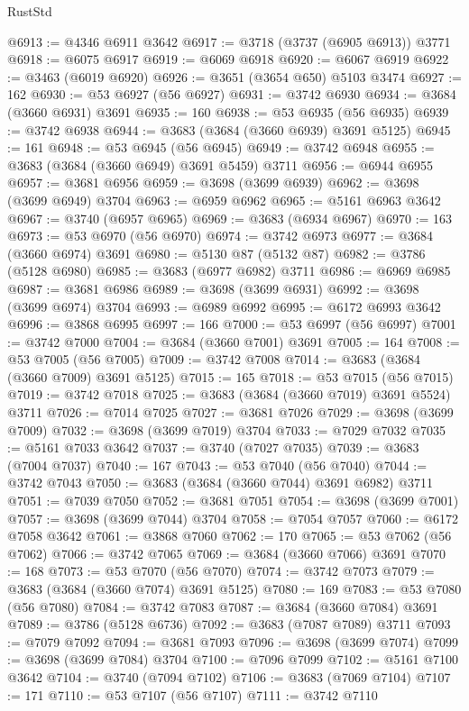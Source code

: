 \begin{lexlean}{RustStd}
\begin{coremodule}
{\begin{coremodule}
{{{{{{{{{{{{{{{{{{{{{{{{{{{{{{{{{{{{{{{{{{{{{{{@6913 := @4346 @6911 @3642
@6917 := @3718 (@3737 (@6905 @6913)) @3771
@6918 := @6075 @6917
@6919 := @6069 @6918
@6920 := @6067 @6919
@6922 := @3463 (@6019 @6920)
@6926 := @3651 (@3654 @650) @5103 @3474
@6927 := 162
@6930 := @53 @6927 (@56 @6927)
@6931 := @3742 @6930
@6934 := @3684 (@3660 @6931) @3691
@6935 := 160
@6938 := @53 @6935 (@56 @6935)
@6939 := @3742 @6938
@6944 := @3683 (@3684 (@3660 @6939) @3691 @5125)
@6945 := 161
@6948 := @53 @6945 (@56 @6945)
@6949 := @3742 @6948
@6955 := @3683 (@3684 (@3660 @6949) @3691 @5459) @3711
@6956 := @6944 @6955
@6957 := @3681 @6956
@6959 := @3698 (@3699 @6939)
@6962 := @3698 (@3699 @6949) @3704
@6963 := @6959 @6962
@6965 := @5161 @6963 @3642
@6967 := @3740 (@6957 @6965)
@6969 := @3683 (@6934 @6967)
@6970 := 163
@6973 := @53 @6970 (@56 @6970)
@6974 := @3742 @6973
@6977 := @3684 (@3660 @6974) @3691
@6980 := @5130 @87 (@5132 @87)
@6982 := @3786 (@5128 @6980)
@6985 := @3683 (@6977 @6982) @3711
@6986 := @6969 @6985
@6987 := @3681 @6986
@6989 := @3698 (@3699 @6931)
@6992 := @3698 (@3699 @6974) @3704
@6993 := @6989 @6992
@6995 := @6172 @6993 @3642
@6996 := @3868 @6995
@6997 := 166
@7000 := @53 @6997 (@56 @6997)
@7001 := @3742 @7000
@7004 := @3684 (@3660 @7001) @3691
@7005 := 164
@7008 := @53 @7005 (@56 @7005)
@7009 := @3742 @7008
@7014 := @3683 (@3684 (@3660 @7009) @3691 @5125)
@7015 := 165
@7018 := @53 @7015 (@56 @7015)
@7019 := @3742 @7018
@7025 := @3683 (@3684 (@3660 @7019) @3691 @5524) @3711
@7026 := @7014 @7025
@7027 := @3681 @7026
@7029 := @3698 (@3699 @7009)
@7032 := @3698 (@3699 @7019) @3704
@7033 := @7029 @7032
@7035 := @5161 @7033 @3642
@7037 := @3740 (@7027 @7035)
@7039 := @3683 (@7004 @7037)
@7040 := 167
@7043 := @53 @7040 (@56 @7040)
@7044 := @3742 @7043
@7050 := @3683 (@3684 (@3660 @7044) @3691 @6982) @3711
@7051 := @7039 @7050
@7052 := @3681 @7051
@7054 := @3698 (@3699 @7001)
@7057 := @3698 (@3699 @7044) @3704
@7058 := @7054 @7057
@7060 := @6172 @7058 @3642
@7061 := @3868 @7060
@7062 := 170
@7065 := @53 @7062 (@56 @7062)
@7066 := @3742 @7065
@7069 := @3684 (@3660 @7066) @3691
@7070 := 168
@7073 := @53 @7070 (@56 @7070)
@7074 := @3742 @7073
@7079 := @3683 (@3684 (@3660 @7074) @3691 @5125)
@7080 := 169
@7083 := @53 @7080 (@56 @7080)
@7084 := @3742 @7083
@7087 := @3684 (@3660 @7084) @3691
@7089 := @3786 (@5128 @6736)
@7092 := @3683 (@7087 @7089) @3711
@7093 := @7079 @7092
@7094 := @3681 @7093
@7096 := @3698 (@3699 @7074)
@7099 := @3698 (@3699 @7084) @3704
@7100 := @7096 @7099
@7102 := @5161 @7100 @3642
@7104 := @3740 (@7094 @7102)
@7106 := @3683 (@7069 @7104)
@7107 := 171
@7110 := @53 @7107 (@56 @7107)
@7111 := @3742 @7110
}}}}}}}}}}}}}}}}}}}}}}}}}}}}}}}}}}}}}}}}}}}}}}}
\end{coremodule}}
\end{coremodule}
\end{lexlean}
